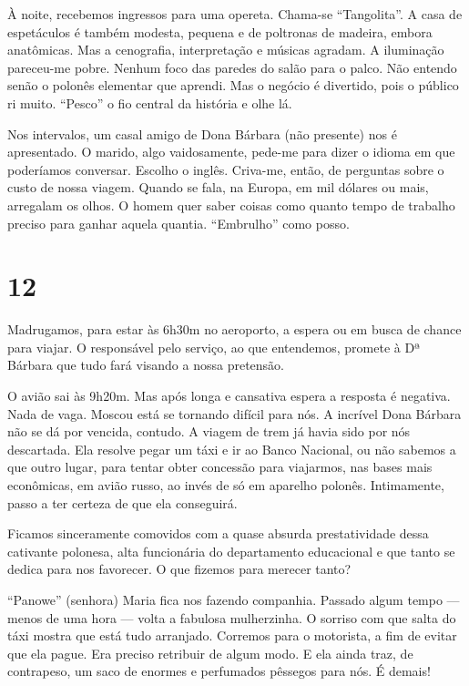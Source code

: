 À noite, recebemos ingressos para uma opereta. Chama-se ``Tangolita''. A casa de espetáculos é também modesta, pequena e de poltronas de madeira, embora anatômicas. Mas a cenografia, interpretação e músicas agradam. A iluminação pareceu-me pobre. Nenhum foco das paredes do salão para o palco. Não entendo senão o polonês elementar que aprendi. Mas o negócio é divertido, pois o público ri muito. ``Pesco'' o fio central da história e olhe lá.

Nos intervalos, um casal amigo de Dona Bárbara (não presente) nos é apresentado. O marido, algo vaidosamente, pede-me para dizer o idioma em que poderíamos conversar. Escolho o inglês. Criva-me, então, de perguntas sobre o custo de nossa viagem. Quando se fala, na Europa, em mil dólares ou mais, arregalam os olhos. O homem quer saber coisas como quanto tempo de trabalho preciso para ganhar aquela quantia. ``Embrulho'' como posso.

\section*{12 \adfflatleafright {}}
Madrugamos, para estar às 6h30m no aeroporto, a espera ou em busca de chance para viajar. O responsável pelo serviço, ao que entendemos, promete à Dª Bárbara que tudo fará visando a nossa pretensão.

O avião sai às 9h20m. Mas após longa e cansativa espera a resposta é negativa. Nada de vaga. Moscou está se tornando difícil para nós. A incrível Dona Bárbara não se dá por vencida, contudo. A viagem de trem já havia sido por nós descartada. Ela resolve pegar um táxi e ir ao Banco Nacional, ou não sabemos a que outro lugar, para tentar obter concessão para viajarmos, nas bases mais econômicas, em avião russo, ao invés de só em aparelho polonês. Intimamente, passo a ter certeza de que ela conseguirá.

Ficamos sinceramente comovidos com a quase absurda prestatividade dessa cativante polonesa, alta funcionária do departamento educacional e que tanto se dedica para nos favorecer. O que fizemos para merecer tanto?

``Panowe'' (senhora) Maria fica nos fazendo companhia. Passado algum tempo --- menos de uma hora --- volta a fabulosa mulherzinha. O sorriso com que salta do táxi mostra que está tudo arranjado. Corremos para o motorista, a fim de evitar que ela pague. Era preciso retribuir de algum modo. E ela ainda traz, de contrapeso, um saco de enormes e perfumados pêssegos para nós. É demais!


